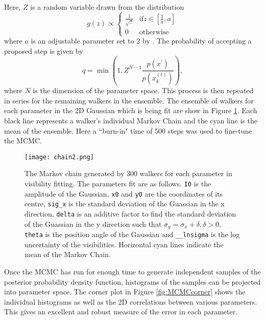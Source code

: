 Here, $Z$ is a random variable drawn from the distribution
\begin{equation}
\label{eq:MCMC_g}
g(z) \propto 
\begin{cases}
\frac{1}{\sqrt{z}} & \mbox{if} z \in \left[\frac{1}{a}, a \right] \\
0 & \mbox{otherwise}
\end{cases}
\end{equation}
where $a$ is an adjustable parameter set to 2 by \cite{Goodman2010}. The probability of accepting a proposed step is given by
\begin{equation}
\label{eq:MCMC_stretch_newstate}
q = \min \left(1, Z^{N-1} \frac{p(x^\prime)}{p(x_k^{(t)})}\right),
\end{equation} 
where $N$ is the dimension of the parameter space. This process is then repeated in series for the remaining walkers in the ensemble.
The ensemble of walkers for each parameter in the 2D Gaussian which is being fit are show in Figure \ref{fig:MCMCchain}. Each black line represents a walker's individual Markov Chain and the cyan line is the mean of the ensemble. Here a ``burn-in" time of 500 steps was used to fine-tune the MCMC. 
\begin{figure}
\centering
\texttt{[image: chain2.png]}
\caption[The Markov chain generated by 300 walkers for each parameter in visibility fitting.]{The Markov chain generated by 300 walkers for each parameter in visibility fitting. The parameters fit are as follows. \texttt{I0} is the amplitude of the Gaussian, \texttt{x0} and \texttt{y0} are the coordinates of its centre, \texttt{sig\_x} is the standard deviation of the Guassian in the x direction, \texttt{delta} is an additive factor to find the standard deviation of the Guassian in the y direction such that $\sigma_y = \sigma_x + \delta, \delta > 0$, \texttt{theta} is the position angle of the Gaussian and \texttt{\_\_lnsigma} is the log uncertainty of the visibilities. Horizontal cyan lines indicate the mean of the Markov Chain.}
\label{fig:MCMCchain}
\end{figure}

Once the MCMC has run for enough time to generate independent samples of the posterior probability density function, histograms of the samples can be projected into parameter space. The corner plot in Figure \ref{fig:MCMCcorner} shows the individual histograms as well as the 2D correlations between various parameters. This gives an excellent and robust measure of the error in each parameter.

